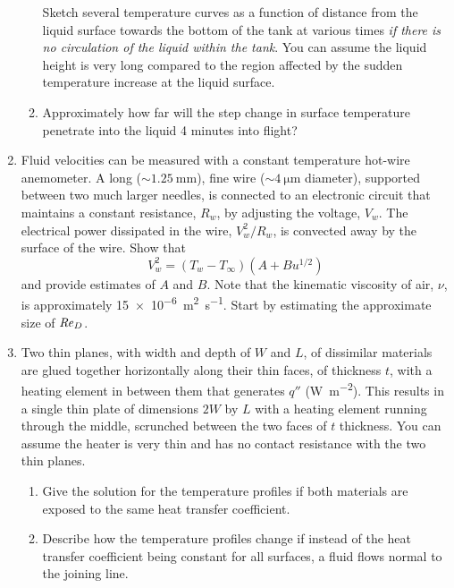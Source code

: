 \documentclass[12pt,letterpaper]{article}
\begin{document}
\begin{enumerate}
\begin{enumerate}
            Sketch several temperature curves as a function of distance from the liquid surface towards the bottom of the tank at various times \textit{if there is no circulation of the liquid within the tank}.
            You can assume the liquid height is very long compared to the region affected by the sudden temperature increase at the liquid surface.
        \newpage
        \item Approximately how far will the step change in surface temperature penetrate into the liquid 4 minutes into flight?
    \end{enumerate}
    \newpage

    \item Fluid velocities can be measured with a constant temperature hot-wire anemometer.
        A long ($\sim \SI{1.25}{\milli\meter}$), fine wire ($\sim \SI{4}{\micro\meter}$ diameter), supported between two much larger needles, is connected to an electronic circuit that maintains a constant resistance, $R_w$, by adjusting the voltage, $V_w$.
        The electrical power dissipated in the wire, $V_w^2 / R_w$, is convected away by the surface of the wire.
        Show that
        \begin{equation*}
            V_w^2 = \left( T_w - T_\infty \right) \left( A + B u^{1/2} \right)
        \end{equation*}
        and provide estimates of $A$ and $B$.
        Note that the kinematic viscosity of air, $\nu$, is approximately \SI{15e-6}{\square\meter\per\second}.
        Start by estimating the approximate size of $\mathit{Re}_D$.
    \newpage
    
    \item Two thin planes, with width and depth of $W$ and $L$, of dissimilar materials are glued together horizontally along their thin faces, of thickness $t$, with a heating element in between them that generates $q'' $ (\si{\watt\per\square\meter}).
    	This results in a single thin plate of dimensions $2 W$ by $L$ with a heating element running through the middle, scrunched between the two faces of $t$ thickness.
    	You can assume the heater is very thin and has no contact resistance with the two thin planes.
    
    \begin{enumerate}
        \item Give the solution for the temperature profiles if both materials are exposed to the same heat transfer coefficient.
        \newpage
        \item Describe how the temperature profiles change if instead of the heat transfer coefficient being constant for all surfaces, a fluid flows normal to the joining line.
    \end{enumerate}
    \newpage


\end{enumerate}
\end{document}
